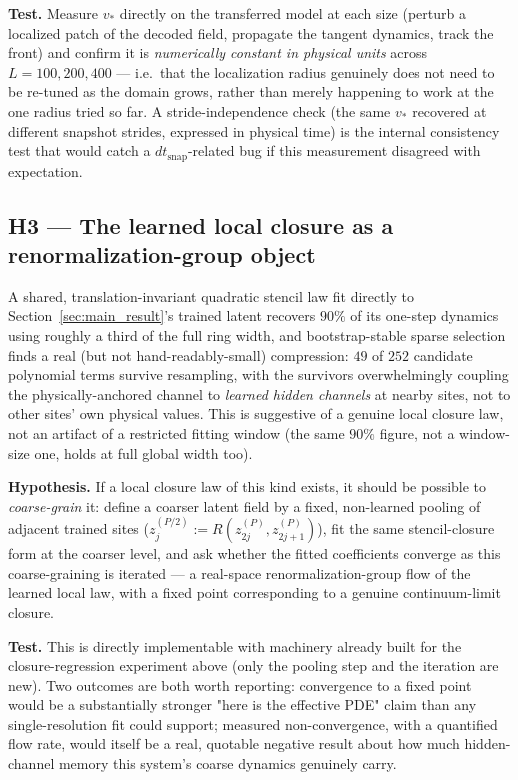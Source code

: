 \documentclass[11pt]{article}
\begin{document}
\textbf{Test.} Measure $v_*$ directly on the transferred model at each
size (perturb a localized patch of the decoded field, propagate the
tangent dynamics, track the front) and confirm it is
\emph{numerically constant in physical units} across $L=100,200,400$
--- i.e.\ that the localization radius genuinely does not need to be
re-tuned as the domain grows, rather than merely happening to work at
the one radius tried so far. A stride-independence check (the same
$v_*$ recovered at different snapshot strides, expressed in physical
time) is the internal consistency test that would catch a
$dt_{\mathrm{snap}}$-related bug if this measurement disagreed with
expectation.

\subsection{H3 --- The learned local closure as a renormalization-group object}

A shared, translation-invariant quadratic stencil law fit directly to
Section~\ref{sec:main_result}'s trained latent recovers $90\%$ of its
one-step dynamics using roughly a third of the full ring width, and
bootstrap-stable sparse selection finds a real (but not
hand-readably-small) compression: $49$ of $252$ candidate polynomial
terms survive resampling, with the survivors overwhelmingly coupling
the physically-anchored channel to \emph{learned hidden channels} at
nearby sites, not to other sites' own physical values. This is
suggestive of a genuine local closure law, not an artifact of a
restricted fitting window (the same $90\%$ figure, not a window-size
one, holds at full global width too).

\textbf{Hypothesis.} If a local closure law of this kind exists, it
should be possible to \emph{coarse-grain} it: define a coarser latent
field by a fixed, non-learned pooling of adjacent trained sites
($z^{(P/2)}_j := R(z^{(P)}_{2j}, z^{(P)}_{2j+1})$), fit the same
stencil-closure form at the coarser level, and ask whether the fitted
coefficients converge as this coarse-graining is iterated --- a
real-space renormalization-group flow of the learned local law, with a
fixed point corresponding to a genuine continuum-limit closure.

\textbf{Test.} This is directly implementable with machinery already
built for the closure-regression experiment above (only the pooling
step and the iteration are new). Two outcomes are both worth reporting:
convergence to a fixed point would be a substantially stronger
"here is the effective PDE" claim than any single-resolution fit
could support; measured non-convergence, with a quantified flow rate,
would itself be a real, quotable negative result about how much
hidden-channel memory this system's coarse dynamics genuinely carry.
\end{document}
